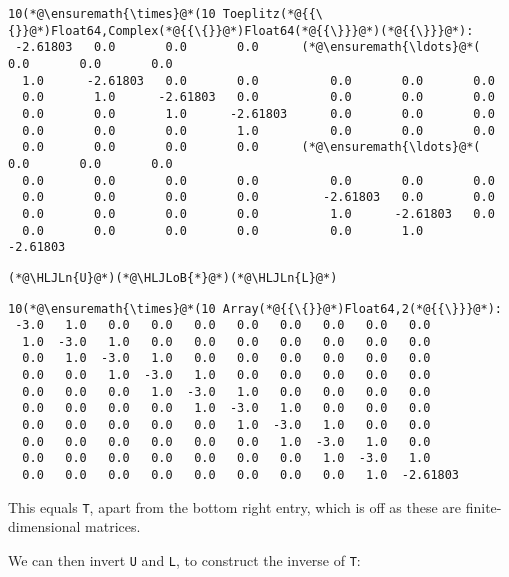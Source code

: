 \documentclass[12pt,a4paper]{article}
\newcommand{\HLJLn}[1]{#1}
\newcommand{\HLJLoB}[1]{\textcolor[RGB]{102,102,102}{\textbf{#1}}}
\begin{document}
\begin{lstlisting}
10(*@\ensuremath{\times}@*(10 Toeplitz(*@{{\{}}@*)Float64,Complex(*@{{\{}}@*)Float64(*@{{\}}}@*)(*@{{\}}}@*):
 -2.61803   0.0       0.0       0.0      (*@\ensuremath{\ldots}@*(   0.0       0.0       0.0
  1.0      -2.61803   0.0       0.0          0.0       0.0       0.0
  0.0       1.0      -2.61803   0.0          0.0       0.0       0.0
  0.0       0.0       1.0      -2.61803      0.0       0.0       0.0
  0.0       0.0       0.0       1.0          0.0       0.0       0.0
  0.0       0.0       0.0       0.0      (*@\ensuremath{\ldots}@*(   0.0       0.0       0.0
  0.0       0.0       0.0       0.0          0.0       0.0       0.0
  0.0       0.0       0.0       0.0         -2.61803   0.0       0.0
  0.0       0.0       0.0       0.0          1.0      -2.61803   0.0
  0.0       0.0       0.0       0.0          0.0       1.0      -2.61803
\end{lstlisting}


\begin{lstlisting}
(*@\HLJLn{U}@*)(*@\HLJLoB{*}@*)(*@\HLJLn{L}@*)
\end{lstlisting}

\begin{lstlisting}
10(*@\ensuremath{\times}@*(10 Array(*@{{\{}}@*)Float64,2(*@{{\}}}@*):
 -3.0   1.0   0.0   0.0   0.0   0.0   0.0   0.0   0.0   0.0
  1.0  -3.0   1.0   0.0   0.0   0.0   0.0   0.0   0.0   0.0
  0.0   1.0  -3.0   1.0   0.0   0.0   0.0   0.0   0.0   0.0
  0.0   0.0   1.0  -3.0   1.0   0.0   0.0   0.0   0.0   0.0
  0.0   0.0   0.0   1.0  -3.0   1.0   0.0   0.0   0.0   0.0
  0.0   0.0   0.0   0.0   1.0  -3.0   1.0   0.0   0.0   0.0
  0.0   0.0   0.0   0.0   0.0   1.0  -3.0   1.0   0.0   0.0
  0.0   0.0   0.0   0.0   0.0   0.0   1.0  -3.0   1.0   0.0
  0.0   0.0   0.0   0.0   0.0   0.0   0.0   1.0  -3.0   1.0
  0.0   0.0   0.0   0.0   0.0   0.0   0.0   0.0   1.0  -2.61803
\end{lstlisting}


This equals \texttt{T}, apart from the bottom right entry, which is off as these are finite-dimensional matrices.

We can then invert \texttt{U} and \texttt{L}, to construct the inverse of \texttt{T}:
\end{document}
